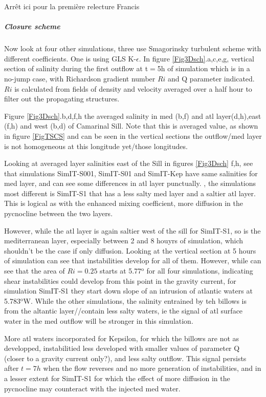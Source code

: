  \color{green} Arrêt ici pour la première relecture Francis \color{black}

\subparagraph{Closure scheme}

Now look at four other simulations, three use Smagorinsky turbulent scheme with different coefficients. One is using GLS K-$\epsilon$. In figure \ref{Fig3Dsch}.a,c,e,g, vertical section of salinity during the first outflow at t$=$5h of simulation which is in a no-jump case, with Richardson gradient number $Ri$ and Q parameter indicated. $Ri$ is calculated from fields of density and velocity averaged over a half hour to filter out the propagating structures.

Figure \ref{Fig3Dsch}.b,d,f,h the averaged salinity in med (b,f) and atl layer(d,h),east (f,h) and west (b,d) of Camarinal Sill. Note that this is averaged value, as shown in figure \ref{FigTSCS} and can be seen in the vertical sections the outflow/med layer is not homogeneous at this longitude yet/those longitudes.


Looking at averaged layer salinities east of the Sill in figures \ref{Fig3Dsch} f,h, see that simulations SimIT-S001, SimIT-S01 and SimIT-Kep have same salinities for med layer, and can see some differences in atl layer punctually. , the simulations most different is SimIT-S1 that has a less salty med layer and a saltier atl layer. This is logical as with the enhanced mixing coefficient, more diffusion in the pycnocline between the two layers.

However, while the atl layer is again saltier west of the sill for SimIT-S1, so is the mediterranean layer, especially between 2 and 8 houyrs of simulation, which shouldn't be the case if only diffusion. Looking at the vertical section at 5 hours of simulation can see that instabilities develop for all of them. However, while can see that the area of $Ri=0.25$ starts at 5.77$^\text{o}$ for all four simulations, indicating shear instabilities could develop from this point in the gravity current, for simulation SimIT-S1 they start down slope of an intrusion of atlantic waters at 5.783$^\text{o}$W. While the other simulations, the salinity entrained by teh billows is from the altantic layer//contain less salty waters, ie the signal of atl surface water in the med outflow will be stronger in this simulation.

More atl waters incorporated for Kepsilon, for which the billows are not as developped, instabilitied less developed with smaller values of parameter Q (closer to a gravity current only?), and less salty outflow. This signal persists after $t=7h$ when the flow reverses and no more generation of instabilities, and in a lesser extent for SimIT-S1 for which the effect of more diffusion in the pycnocline may counteract with the injected med water.


